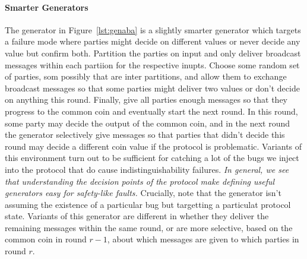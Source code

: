 \paragraph{Smarter Generators}
The generator in Figure~\ref{lst:genaba} is a slightly smarter generator which
targets a failure mode where parties might decide on different values or never
decide any value but confirm both.  Partition the parties on input and only
deliver broadcast messages within each partiion for the respective inupts.
Choose some random set of parties, som possibly that are inter partitions, and
allow them to exchange broadcast messages so that some parties might deliver
two values or don't decide on anything this round.  Finally, give all parties
enough  messages so that they progress to the common coin and
eventually start the next round.  In this round, some party may decide the
output of the common coin, and in the next round the generator selectively give
messages so that parties that didn't decide this round may decide a different
coin value if the protocol is problematic.  Variants of this environment turn
out to be sufficient for catching a lot of the bugs we inject into the protocol
that do cause indistinguishability failures.  \emph{In general, we see that
understanding the decision points of the protocol make defining useful
generators easy for safety-like faults.} Crucially, note that the generator
isn't assuming the existence of a particular bug but targetting a particulat
protocol state.  Variants of this generator are different in whether they
deliver the remaining  messages within the same round, or are more
selective, based on the common coin in round $r-1$, about which messages are
given to which parties in round $r$.



